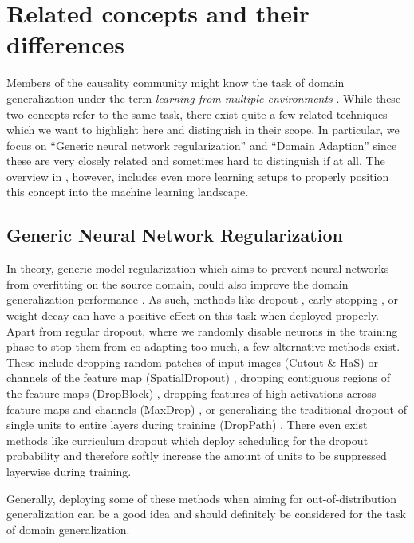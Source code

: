 \section{Related concepts and their differences}

Members of the causality community might know the task of domain generalization under the term \emph{learning from multiple environments} \citep{arjovsky2019invariant, gulrajani2020search, PetBuhMei15}. While these two concepts refer to the same task, there exist quite a few related techniques which we want to highlight here and distinguish in their scope. In particular, we focus on ``Generic neural network regularization'' and ``Domain Adaption'' since these are very closely related and sometimes hard to distinguish if at all. The overview in , however, includes even more learning setups to properly position this concept into the machine learning landscape.

\subsection{Generic Neural Network Regularization}

In theory, generic model regularization which aims to prevent neural networks from overfitting on the source domain, could also improve the domain generalization performance \citep{huang2020selfchallenging}. As such, methods like dropout \citep{SrivastavaHKSS14}, early stopping \citep{CaruanaLG00}, or weight decay \citep{NowlanH92} can have a positive effect on this task when deployed properly. Apart from regular dropout, where we randomly disable neurons in the training phase to stop them from co-adapting too much, a few alternative methods exist. These include dropping random  patches of input images (Cutout \& HaS) \citep{devries2017improved, SinghL17} or channels of the feature map (SpatialDropout) \citep{TompsonGJLB15}, dropping contiguous regions of the feature maps (DropBlock) \citep{GhiasiLL18}, dropping features of high activations across feature maps and channels (MaxDrop) \citep{ParkK16}, or generalizing the traditional dropout of single units to entire layers during training (DropPath) \citep{LarssonMS17}. There even exist methods like curriculum dropout \citep{MorerioCVVM17} which deploy scheduling for the dropout probability and therefore softly increase the amount of units to be suppressed layerwise during training. 

Generally, deploying some of these methods when aiming for out-of-distribution generalization can be a good idea and should definitely be considered for the task of domain generalization.


